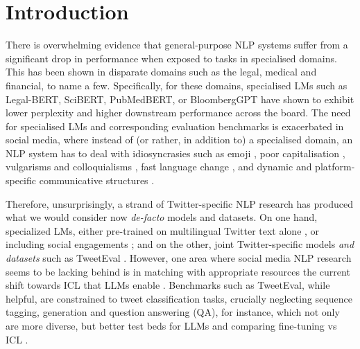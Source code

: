 
\section{Introduction}
There is overwhelming evidence that general-purpose \ac{NLP} systems suffer from a significant drop in performance when exposed to tasks in specialised domains. This has been shown in disparate domains such as the legal, medical and financial, to name a few. Specifically, for these domains, specialised \acp{LM} such as Legal-BERT, SciBERT, PubMedBERT, or BloombergGPT \cite{chalkidis2020legal,beltagy2019scibert,gu2021domain,wu2023bloomberggpt} have shown to exhibit lower perplexity and higher downstream performance across the board. The need for specialised \acp{LM} and corresponding evaluation benchmarks is exacerbated in social media, where instead of (or rather, in addition to) a specialised domain, an NLP system has to deal with idiosyncrasies such as emoji \cite{miller2017understanding,cappallo2018new,barbieri2017emojis}, poor capitalisation \cite{derczynski2015analysis}, vulgarisms and colloquialisms \cite{camacho2020learning}, fast language change \cite{del2019short,loureiro-etal-2022-timelms}, and dynamic and platform-specific communicative structures \cite{bastos2013gatekeeping}.

Therefore, unsurprisingly, a strand of Twitter-specific NLP research has produced what we would consider now \textit{de-facto} models and datasets. On one hand, specialized \acp{LM}, either pre-trained on multilingual Twitter text alone \cite{bertweet,delucia2022bernice,barbieri2021xlm}, or including social engagements \cite{zhang2022twhin}; and on the other, joint Twitter-specific models \textit{and datasets} such as TweetEval \cite{barbieri2020tweeteval}. However, one area where social media NLP research seems to be lacking behind is in matching with appropriate resources the current shift towards \ac{ICL} that \acp{LLM} enable \cite{min2022metaicl}. Benchmarks such as TweetEval, while helpful, are constrained to tweet classification tasks, crucially neglecting sequence tagging, generation and question answering (QA), for instance, which not only are more diverse, but better test beds for \acp{LLM} and comparing fine-tuning vs ICL \cite{liu2022few}.

